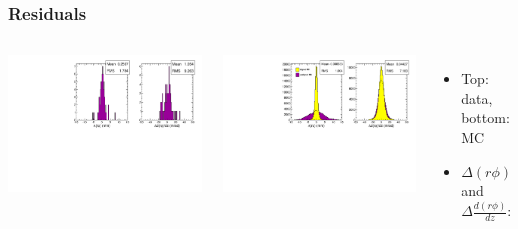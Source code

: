 \documentclass[compress]{beamer}
\begin{document}
\begin{frame}
\frametitle{Residuals}

\begin{columns}
\includegraphics[width=\linewidth]{REAL_residuals.pdf}

\includegraphics[width=\linewidth]{MCBeamHalo_residuals.pdf}


\begin{itemize}
\item Top: data, bottom: MC

\item $\Delta (r\phi)$ and $\Delta \frac{d(r\phi)}{dz}$:
\end{itemize}


\end{columns}
\end{frame}
\end{document}

